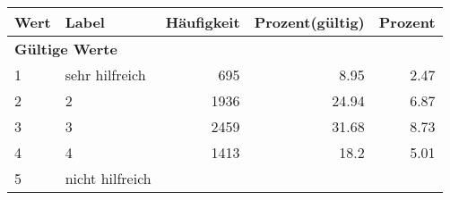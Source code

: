      \begin{longtable}{lXrrr}
     \toprule
     \textbf{Wert} & \textbf{Label} & \textbf{Häufigkeit} & \textbf{Prozent(gültig)} & \textbf{Prozent} \\
     \endhead
     \midrule
     \multicolumn{5}{l}{\textbf{Gültige Werte}}\\

     1 &
     \multicolumn{1}{X}{ sehr hilfreich   } &


       \num{695} &
       \num[round-mode=places,round-precision=2]{8,95} &
         \num[round-mode=places,round-precision=2]{2,47} \\

     2 &
     \multicolumn{1}{X}{ 2   } &


       \num{1936} &
       \num[round-mode=places,round-precision=2]{24,94} &
         \num[round-mode=places,round-precision=2]{6,87} \\

     3 &
     \multicolumn{1}{X}{ 3   } &


       \num{2459} &
       \num[round-mode=places,round-precision=2]{31,68} &
         \num[round-mode=places,round-precision=2]{8,73} \\

     4 &
     \multicolumn{1}{X}{ 4   } &


       \num{1413} &
       \num[round-mode=places,round-precision=2]{18,2} &
         \num[round-mode=places,round-precision=2]{5,01} \\

     5 &
     \multicolumn{1}{X}{ nicht hilfreich   } &



\end{longtable}

